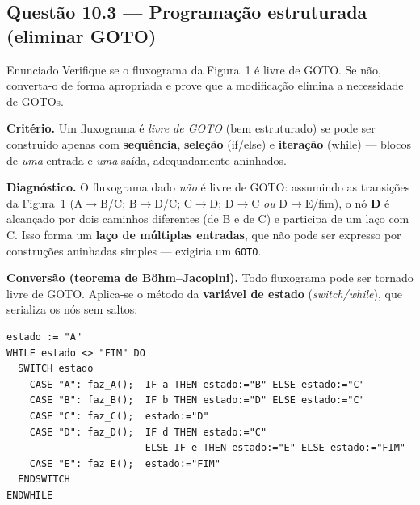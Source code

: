 \documentclass[11pt,a4paper]{article}
\begin{document}
\subsection*{Questão 10.3 — Programação estruturada (eliminar GOTO)}
\begin{questao}{Enunciado}
Verifique se o fluxograma da Figura~1 é livre de GOTO. Se não, converta-o de
forma apropriada e prove que a modificação elimina a necessidade de GOTOs.
\end{questao}
\begin{resposta}
\textbf{Critério.} Um fluxograma é \emph{livre de GOTO} (bem estruturado) se pode
ser construído apenas com \textbf{sequência}, \textbf{seleção} (if/else) e
\textbf{iteração} (while) — blocos de \emph{uma} entrada e \emph{uma} saída,
adequadamente aninhados.

\textbf{Diagnóstico.} O fluxograma dado \emph{não} é livre de GOTO: assumindo as
transições da Figura~1 (A$\to$B/C; B$\to$D/C; C$\to$D; D$\to$C \emph{ou} D$\to$E/fim),
o nó \textbf{D} é alcançado por dois caminhos diferentes (de B e de C) e participa
de um laço com C. Isso forma um \textbf{laço de múltiplas entradas}, que não pode
ser expresso por construções aninhadas simples — exigiria um \texttt{GOTO}.

\textbf{Conversão (teorema de Böhm--Jacopini).} Todo fluxograma pode ser tornado
livre de GOTO. Aplica-se o método da \textbf{variável de estado} (\emph{switch/while}),
que serializa os nós sem saltos:
\begin{lstlisting}
estado := "A"
WHILE estado <> "FIM" DO
  SWITCH estado
    CASE "A": faz_A();  IF a THEN estado:="B" ELSE estado:="C"
    CASE "B": faz_B();  IF b THEN estado:="D" ELSE estado:="C"
    CASE "C": faz_C();  estado:="D"
    CASE "D": faz_D();  IF d THEN estado:="C"
                        ELSE IF e THEN estado:="E" ELSE estado:="FIM"
    CASE "E": faz_E();  estado:="FIM"
  ENDSWITCH
ENDWHILE
\end{lstlisting}


\end{resposta}
\end{document}
